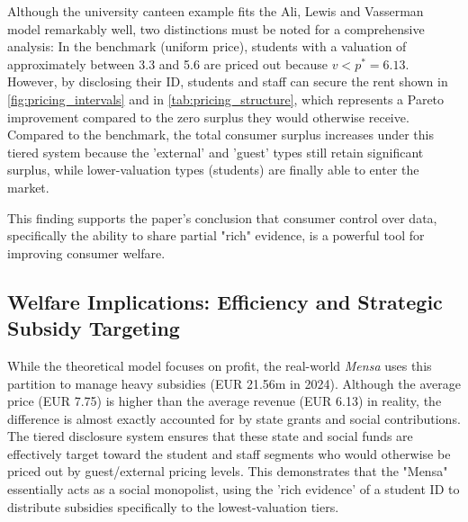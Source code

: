 \documentclass[12pt, a4paper]{article}
\begin{document}
Although the university canteen example fits the Ali, Lewis and Vasserman model remarkably well, two distinctions must be noted for a comprehensive analysis:
In the benchmark (uniform price), students with a valuation of approximately between 3.3 and 5.6 are priced out because $v < p^* =6.13$. However, by disclosing their ID, students and staff can secure the rent shown in \cref{fig:pricing_intervals} and in \cref{tab:pricing_structure}, which represents a Pareto improvement compared to the zero surplus they would otherwise receive. Compared to the benchmark, the total consumer surplus increases under this tiered system because the 'external' and 'guest' types still retain significant surplus, while lower-valuation types (students) are finally able to enter the market.

This finding supports the paper's conclusion that consumer control over data, specifically the ability to share partial "rich" evidence, is a powerful tool for improving consumer welfare.

\subsection{Welfare Implications: Efficiency and Strategic Subsidy Targeting}
While the theoretical model focuses on profit, the real-world \textit{Mensa} uses this partition to manage heavy subsidies (EUR 21.56m in 2024).
Although the average price (EUR 7.75) is higher than the average revenue (EUR 6.13) in reality, the difference is almost exactly accounted for by state grants and social contributions.
The tiered disclosure system ensures that these state and social funds are effectively target toward the student and staff segments who would otherwise be priced out by guest/external pricing levels. This demonstrates that the "Mensa"  essentially acts as a social monopolist, using the 'rich evidence' of a student ID to distribute subsidies specifically to the lowest-valuation tiers.
\end{document}
